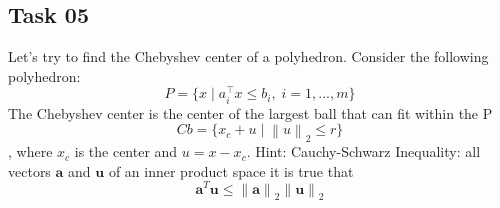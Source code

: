 \documentclass[12pt]{article}%
\begin{document}
\subsection{Task 05}
Let's try to find the Chebyshev center of a polyhedron. Consider the following polyhedron:
\begin{equation}
    P = \{ x\mid a_i^{\top}x \leq b_i, \; i=1,...,m\}
\end{equation} The Chebyshev center is the center of the largest ball that can fit within the P
\begin{equation}
    Cb = \{ x_c+u\mid \left \| u \right \|_2 \leq r\}
\end{equation}, where $x_c$ is the center and $u = x-x_c$. Hint: Cauchy-Schwarz Inequality: all vectors $\mathbf{a}$ and $\mathbf{u}$ of an inner product space it is true that
\begin{equation}
    \mathbf{a}^T\mathbf{u} \leq \left \| \mathbf{a} \right \|_2 \left \| \mathbf{u} \right \|_2
\end{equation}
\end{document}

